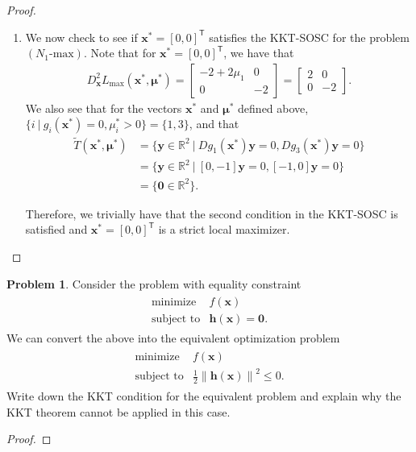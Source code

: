\documentclass[12pt]{article}
\theoremstyle{definition}
\newtheorem{problem}{Problem}
\newcommand{\vc}[1]{\boldsymbol{#1}}
\newcommand{\norm}[1]{\left\lVert#1\right\rVert}
\newcommand{\tran}{\mathsf{T}}
\begin{document}
\begin{proof}
\begin{enumerate}
      For the problem $(N_1\text{-min})$, conditions
      ii a.\ and iii a.\ imply that $\mu_2 - \mu_3 = -\mu_3 = -4$ and $\mu_2 - \mu_1 = -\mu_1 = -2$
      or that $\mu_1 = 2$, $\mu_2 = 0$, and $\mu_3 = 4$. Therefore, the vector $\vc{x}^* = [0,0]^\tran$
      satisfies the KKT-FONC for the problem $(N_1\text{-max})$ with associated KKT multiplier $\vc{\mu}^* = [2,0,4]^\tran$.
    \item We now check to see if $\vc{x}^* = [0,0]^\tran$ satisfies the KKT-SOSC for the problem $(N_1\text{-max})$.
      Note that for $\vc{x}^*=[0,0]^\tran$, we have that
      \begin{align*}
        D_{\vc{x}}^2L_{\max}(\vc{x}^*, \vc{\mu}^*) = \begin{bmatrix}-2 + 2\mu_1 & 0 \\ 0 & -2 \end{bmatrix} = \begin{bmatrix}2 & 0 \\ 0 & -2 \end{bmatrix}.
      \end{align*}
      We also see that for the vectors $\vc{x}^*$ and $\vc{\mu}^*$ defined above, $\{i\ |\ g_i(\vc{x}^*) = 0, \mu_i^* > 0\} = \{1,3\}$, and that
      \begin{align*}
        \widetilde{T}(\vc{x}^*, \vc{\mu}^*) &= \{\vc{y}\in\mathbb{R}^2 \ |\ Dg_1(\vc{x}^*)\vc{y} = 0, Dg_3(\vc{x}^*)\vc{y} = 0\} \\
        &= \{\vc{y}\in\mathbb{R}^2 \ |\ [0, -1]\vc{y} = 0, [-1, 0]\vc{y} = 0\} \\
        &= \{\vc{0}\in\mathbb{R}^2\}.
      \end{align*}

      Therefore, we trivially have that the second condition in the KKT-SOSC is satisfied
      and $\vc{x}^{*} = [0,0]^\tran$ is a strict local maximizer.
  \end{enumerate}
\end{proof}
\newpage


\begin{problem}
  Consider the problem with equality constraint
  \begin{align*}
    \begin{array}{rl}
      \text{minimize} & f(\vc{x})\\
      \text{subject to} & \vc{h}(\vc{x}) = \vc{0}.
    \end{array}
  \end{align*}
  We can convert the above into the equivalent optimization problem
  \begin{align*}
    \begin{array}{rl}
      \text{minimize} & f(\vc{x})\\
      \text{subject to} & \frac{1}{2} \norm{\vc{h}(\vc{x})}^2 \leq 0.
    \end{array}
  \end{align*}
  Write down the KKT condition for the equivalent problem and explain why the KKT
  theorem cannot be applied in this case.
\end{problem}

\begin{proof}
\end{proof}
\end{document}
